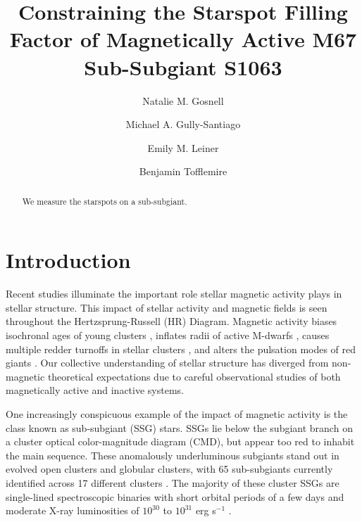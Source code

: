 \documentclass[trackchanges]{aastex631}
\begin{document}

\title{Constraining the Starspot Filling Factor of Magnetically Active M67 Sub-Subgiant S1063}

\author{Natalie M. Gosnell}
\author{Michael A. Gully-Santiago}
\author{Emily M. Leiner}
\author{Benjamin Tofflemire}


\begin{abstract}

We measure the starspots on a sub-subgiant.

\end{abstract}



\section{Introduction}\label{sec:intro}
Recent studies illuminate the important role stellar magnetic activity plays in stellar structure. This impact of stellar activity and magnetic fields is seen throughout the Hertzsprung-Russell (HR) Diagram. Magnetic activity biases isochronal ages of young clusters \citep{somers15}, inflates radii of active M-dwarfs \citep{2010AJ....140.1158T,2010ApJ...718..502M,2019MNRAS.483.1125J}, causes multiple redder turnoffs in stellar clusters \citep{2009MNRAS.398L..11B,2019ApJ...876..113S}, and alters the pulsation modes of red giants \citep{2020A&A...639A..63G}. Our collective understanding of stellar structure has diverged from non-magnetic theoretical expectations due to careful observational studies of both magnetically active and inactive systems.

One increasingly conspicuous example of the impact of magnetic activity is the class known as sub-subgiant (SSG) stars.  SSGs lie below the subgiant branch on a cluster optical color-magnitude diagram (CMD), but appear too red to inhabit the main sequence. These anomalously underluminous subgiants stand out in evolved open clusters and globular clusters, with 65 sub-subgiants currently identified across 17 different clusters \citep{geller17}. The majority of these cluster SSGs are single-lined spectroscopic binaries with short orbital periods of a few days and moderate X-ray luminosities of $10^{30}$ to $10^{31}$ erg s$^{-1}$ \citep[and references therein]{geller17}.
\end{document}

